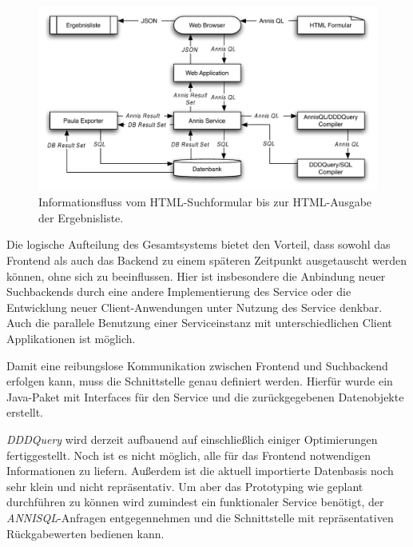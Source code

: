 \begin{figure}[H]
	\centering
	\includegraphics*[width=1.0\textwidth]{figures/Informationsfluss}
	\caption{Informationsfluss vom HTML-Suchformular bis zur HTML-Ausgabe der Ergebnisliste.}
	\label{fig:Informationsfluss}
\end{figure}

Die logische Aufteilung des Gesamtsystems bietet den Vorteil, dass sowohl das Frontend als auch das Backend zu einem späteren Zeitpunkt ausgetauscht werden können, ohne sich zu beeinflussen. Hier ist insbesondere die Anbindung neuer Suchbackends durch eine andere Implementierung des Service oder die Entwicklung neuer Client-Anwendungen unter Nutzung des Service denkbar. Auch die parallele Benutzung einer Serviceinstanz mit unterschiedlichen Client Applikationen ist möglich.

Damit eine reibungslose Kommunikation zwischen Frontend und Suchbackend erfolgen kann, muss die Schnittstelle genau definiert werden. Hierfür wurde ein Java-Paket mit Interfaces für den Service und die zurückgegebenen Datenobjekte erstellt.

\emph{DDDQuery} wird derzeit aufbauend auf \citet{dddquery} einschließlich einiger Optimierungen fertiggestellt. Noch ist es nicht möglich, alle für das Frontend notwendigen Informationen zu liefern. Außerdem ist die aktuell importierte Datenbasis noch sehr klein und nicht repräsentativ. Um aber das Prototyping wie geplant durchführen zu können wird zumindest ein funktionaler Service benötigt, der \emph{ANNISQL}-Anfragen entgegennehmen und die Schnittstelle mit repräsentativen Rückgabewerten bedienen kann.